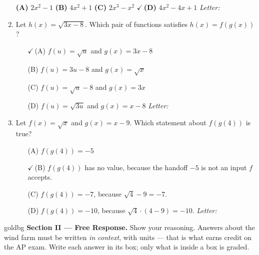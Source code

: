 \documentclass[10pt]{article}
\begin{document}
\begin{enumerate}[leftmargin=1.9em, itemsep=12pt]
      \smallskip
      \textbf{(A)} $2x^2 - 1$ \hspace{1.8em} \textbf{(B)} $4x^2 + 1$ \hspace{1.8em}
      \textbf{(C)} $2x^3 - x^2$ \hspace{1.8em} {\color{keyred}\textbf{$\checkmark$\,(D)}} $4x^2 - 4x + 1$ \hfill\textit{Letter:}~\gradedblank[id=ap3, type=choice, points=1, answer=D]{0.42in}{13pt}

\item Let $h(x) = \sqrt{3x - 8}$. Which pair of functions satisfies $h(x) = f(g(x))$?
      \begin{enumerate}[leftmargin=2.6em, itemsep=2pt]
        \item[{\color{keyred}$\checkmark$\,(A)}] $f(u) = \sqrt{u}$ \quad and \quad $g(x) = 3x - 8$
        \item[(B)] $f(u) = 3u - 8$ \quad and \quad $g(x) = \sqrt{x}$
        \item[(C)] $f(u) = \sqrt{u} - 8$ \quad and \quad $g(x) = 3x$
        \item[(D)] $f(u) = \sqrt{3u}$ \quad and \quad $g(x) = x - 8$ \hfill\textit{Letter:}~\gradedblank[id=ap4, type=choice, points=1, answer=A]{0.42in}{13pt}
      \end{enumerate}

\item Let $f(x) = \sqrt{x}$ and $g(x) = x - 9$. Which statement about $f(g(4))$ is true?
      \begin{enumerate}[leftmargin=2.6em, itemsep=2pt]
        \item[(A)] $f(g(4)) = -5$
        \item[{\color{keyred}$\checkmark$\,(B)}] $f(g(4))$ has no value, because the handoff $-5$ is not an input $f$ accepts.
        \item[(C)] $f(g(4)) = -7$, because $\sqrt{4} - 9 = -7$.
        \item[(D)] $f(g(4)) = -10$, because $\sqrt{4} \cdot (4 - 9) = -10$. \hfill\textit{Letter:}~\gradedblank[id=ap5, type=choice, points=1, answer=B]{0.42in}{13pt}
      \end{enumerate}

\end{enumerate}

\newpage

\begin{headlinebox}{goldbg}
\small
\textbf{Section II --- Free Response.} Show your reasoning. Answers about the wind farm must be
written \emph{in context}, with units --- that is what earns credit on the AP exam. Write each answer in its box; only what is inside a box is graded.
\end{headlinebox}
\end{document}
